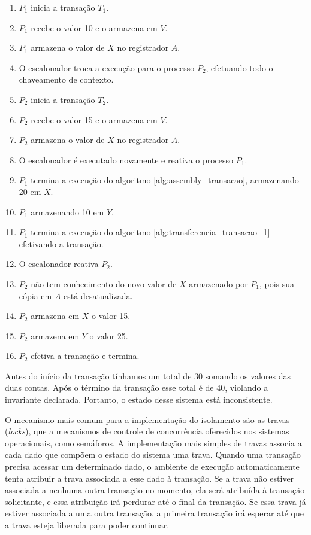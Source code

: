 \documentclass[11pt,twoside,a4paper]{book}
\begin{document}
\begin{enumerate}
	\item $P_1$ inicia a transação $T_1$.
	\item $P_1$ recebe o valor 10 e o armazena em $V$.
	\item $P_1$ armazena o valor de $X$ no registrador $A$.
	\item O escalonador troca a execução para o processo $P_2$, efetuando todo o chaveamento de contexto.
	\item $P_2$ inicia a transação $T_2$.
	\item $P_2$ recebe o valor 15 e o armazena em $V$.
	\item $P_2$ armazena o valor de $X$ no registrador $A$.
	\item O escalonador é executado novamente e reativa o processo $P_1$.
	\item $P_1$ termina a execução do algoritmo \ref{alg:assembly_transacao}, armazenando 20 em $X$.
	\item $P_1$ armazenando 10 em $Y$.
	\item $P_1$ termina a execução do algoritmo \ref{alg:transferencia_transacao_1} efetivando a transação.
	\item O escalonador reativa $P_2$.
	\item $P_2$ não tem conhecimento do novo valor de $X$ armazenado por $P_1$, pois sua cópia em $A$ está desatualizada.
	\item $P_2$ armazena em $X$ o valor 15.
	\item $P_2$ armazena em $Y$ o valor 25.
	\item $P_2$ efetiva a transação e termina.
\end{enumerate}

Antes do início da transação tínhamos um total de 30 somando os valores das duas contas. Após o término da transação esse total é de 40, violando a invariante declarada. Portanto, o estado desse sistema está inconsistente.

O mecanismo mais comum para a implementação do isolamento são as travas (\emph{locks}), que a mecanismos de controle de concorrência oferecidos nos sistemas operacionais, como semáforos. A implementação mais simples de travas associa a cada dado que compõem o estado do sistema uma trava. Quando uma transação precisa acessar um determinado dado, o ambiente de execução automaticamente tenta atribuir a trava associada a esse dado à transação. Se a trava não estiver associada a nenhuma outra transação no momento, ela será atribuída à transação solicitante, e essa atribuição irá perdurar até o final da transação. Se essa trava já estiver associada a uma outra transação, a primeira transação irá esperar até que a trava esteja liberada para poder continuar.
\end{document}
